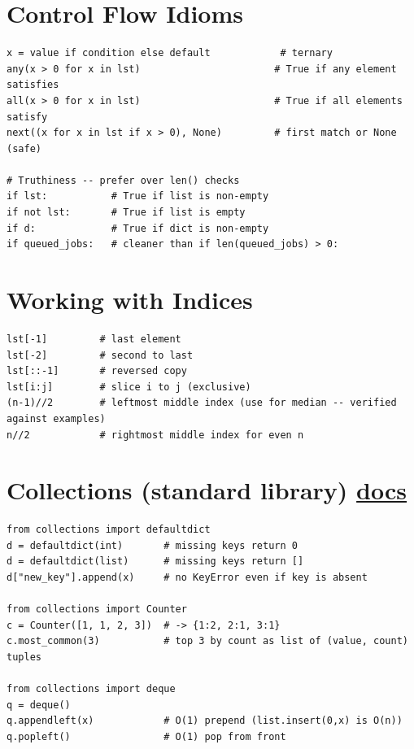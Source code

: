 \documentclass[10pt,letterpaper]{article}
\begin{document}
\section{Control Flow Idioms}

\begin{lstlisting}
x = value if condition else default            # ternary
any(x > 0 for x in lst)                       # True if any element satisfies
all(x > 0 for x in lst)                       # True if all elements satisfy
next((x for x in lst if x > 0), None)         # first match or None (safe)

# Truthiness -- prefer over len() checks
if lst:           # True if list is non-empty
if not lst:       # True if list is empty
if d:             # True if dict is non-empty
if queued_jobs:   # cleaner than if len(queued_jobs) > 0:
\end{lstlisting}

\section{Working with Indices}

\begin{lstlisting}
lst[-1]         # last element
lst[-2]         # second to last
lst[::-1]       # reversed copy
lst[i:j]        # slice i to j (exclusive)
(n-1)//2        # leftmost middle index (use for median -- verified against examples)
n//2            # rightmost middle index for even n
\end{lstlisting}

\section{Collections (standard library) \normalfont\small\href{https://docs.python.org/3/library/collections.html}{docs}}

\begin{lstlisting}
from collections import defaultdict
d = defaultdict(int)       # missing keys return 0
d = defaultdict(list)      # missing keys return []
d["new_key"].append(x)     # no KeyError even if key is absent

from collections import Counter
c = Counter([1, 1, 2, 3])  # -> {1:2, 2:1, 3:1}
c.most_common(3)           # top 3 by count as list of (value, count) tuples

from collections import deque
q = deque()
q.appendleft(x)            # O(1) prepend (list.insert(0,x) is O(n))
q.popleft()                # O(1) pop from front
\end{lstlisting}
\end{document}
